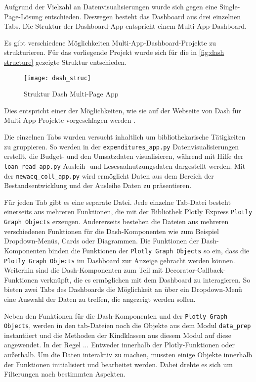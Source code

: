     Aufgrund der Vielzahl an Datenvisualisierungen wurde sich gegen eine Single-Page-Lösung entschieden. Deswegen besteht das Dashboard
    aus drei einzelnen Tabs. Die Struktur der Dashboard-App entspricht einem Multi-App-Dashboard. 
    
    Es gibt verschiedene Möglichkeiten Multi-App-Dashboard-Projekte zu strukturieren. Für das vorliegende Projekt wurde sich für die in \autoref{fig:dash structure}
    gezeigte Struktur entschieden.

    \begin{figure}[H]
        \centering
            \texttt{[image: dash\_struc]}
            \caption{Struktur Dash Multi-Page App}
            \label{fig:dash structure}
    \end{figure}
    
    Dies entspricht einer der Möglichkeiten, wie sie auf der Webseite von Dash für Multi-App-Projekte vorgeschlagen werden \cite[vgl.][]{plotly_url_2021}.
    
    Die einzelnen Tabs wurden versucht inhaltlich um bibliothekarische Tätigkeiten zu gruppieren. So werden in der \texttt{expenditures\_app.py}
    Datenvisualisierungen erstellt, die Budget- und den Umsatzdaten visualisieren, während mit Hilfe der \texttt{loan\_read\_app.py}
    Ausleih- und Lesesaalnutzungsdaten dargestellt werden. Mit der \texttt{newacq\_coll\_app.py} wird ermöglicht Daten aus dem Bereich der Bestandsentwicklung und der 
    Ausleihe Daten zu präsentieren.

    Für jeden Tab gibt es eine separate Datei. Jede einzelne Tab-Datei besteht einerseits aus mehreren Funktionen, die mit der Bibliothek Plotly Express \texttt{Plotly Graph Objects} erzeugen.
    Andererseits bestehen die Dateien aus mehreren verschiedenen Funktionen für die Dash-Komponenten wie zum Beispiel Dropdown-Menüs, Cards oder Diagrammen. 
    Die Funktionen der Dash-Komponenten binden die Funktionen der \texttt{Plotly Graph Objects} so ein, dass die \texttt{Plotly Graph Objects} im Dashboard zur Anzeige gebracht werden können. 
    Weiterhin sind die Dash-Komponenten zum Teil mit Decorator-Callback-Funktionen verknüpft, die es ermöglichen mit dem Dashboard zu interagieren. 
    So bieten zwei Tabs des Dashboards die Möglichkeit an über ein Dropdown-Menü eine Auswahl der Daten zu treffen,
    die angezeigt werden sollen.

    Neben den Funktionen für die Dash-Komponenten und der \texttt{Plotly Graph Objects}, werden in den tab-Dateien noch die Objekte aus dem Modul \texttt{data\_prep} 
    instantiiert und die Methoden der Kindklassen aus diesem Modul auf diese angewendet. In der Regel ... Entweder innerhalb der Plotly-Funktionen oder außerhalb. Um die
    Daten interaktiv zu machen, mussten einige Objekte innerhalb der Funktionen initialisiert und bearbeitet werden. Dabei drehte es sich um Filterungen nach bestimmten Aspekten.


